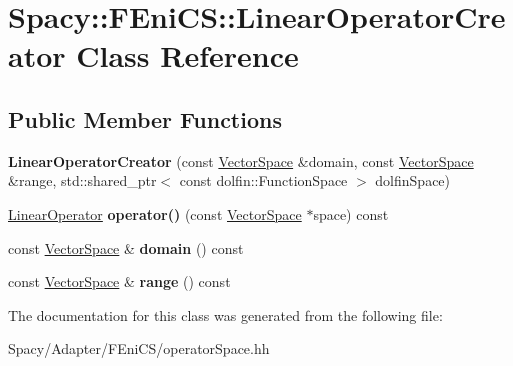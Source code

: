 \hypertarget{classSpacy_1_1FEniCS_1_1LinearOperatorCreator}{}\section{Spacy\+:\+:F\+Eni\+C\+S\+:\+:Linear\+Operator\+Creator Class Reference}
\label{classSpacy_1_1FEniCS_1_1LinearOperatorCreator}
\subsection*{Public Member Functions}
\begin{DoxyCompactItemize}
\item 
\hypertarget{classSpacy_1_1FEniCS_1_1LinearOperatorCreator_ac95b6324d13993c0a8e2393a4521e14b}{}{\bfseries Linear\+Operator\+Creator} (const \hyperlink{classSpacy_1_1VectorSpace}{Vector\+Space} \&domain, const \hyperlink{classSpacy_1_1VectorSpace}{Vector\+Space} \&range, std\+::shared\+\_\+ptr$<$ const dolfin\+::\+Function\+Space $>$ dolfin\+Space)\label{classSpacy_1_1FEniCS_1_1LinearOperatorCreator_ac95b6324d13993c0a8e2393a4521e14b}

\item 
\hypertarget{classSpacy_1_1FEniCS_1_1LinearOperatorCreator_a2ef756542e2bab847054dc90726d1f50}{}\hyperlink{classSpacy_1_1FEniCS_1_1LinearOperator}{Linear\+Operator} {\bfseries operator()} (const \hyperlink{classSpacy_1_1VectorSpace}{Vector\+Space} $\ast$space) const \label{classSpacy_1_1FEniCS_1_1LinearOperatorCreator_a2ef756542e2bab847054dc90726d1f50}

\item 
\hypertarget{classSpacy_1_1FEniCS_1_1LinearOperatorCreator_a0eab2a20a95036e44e44dee2c64b3b26}{}const \hyperlink{classSpacy_1_1VectorSpace}{Vector\+Space} \& {\bfseries domain} () const \label{classSpacy_1_1FEniCS_1_1LinearOperatorCreator_a0eab2a20a95036e44e44dee2c64b3b26}

\item 
\hypertarget{classSpacy_1_1FEniCS_1_1LinearOperatorCreator_a9a26a81885dfe279565f48cee5fb43ed}{}const \hyperlink{classSpacy_1_1VectorSpace}{Vector\+Space} \& {\bfseries range} () const \label{classSpacy_1_1FEniCS_1_1LinearOperatorCreator_a9a26a81885dfe279565f48cee5fb43ed}

\end{DoxyCompactItemize}


The documentation for this class was generated from the following file\+:\begin{DoxyCompactItemize}
\item 
Spacy/\+Adapter/\+F\+Eni\+C\+S/operator\+Space.\+hh\end{DoxyCompactItemize}
